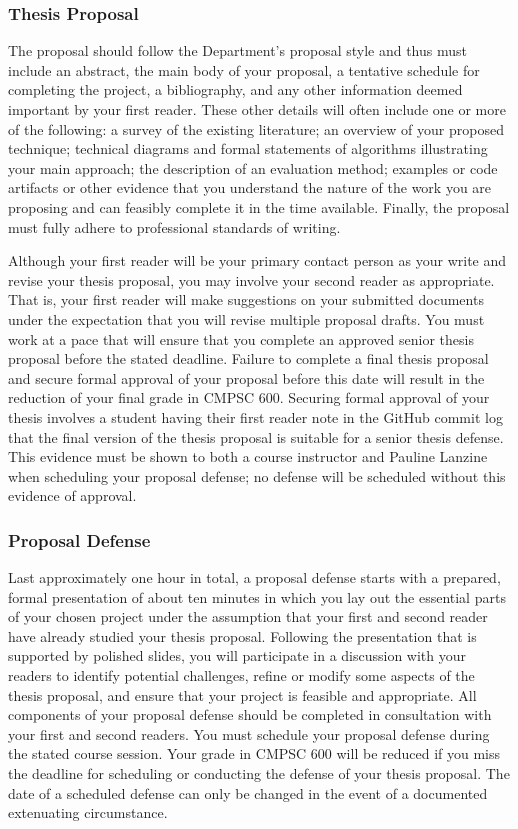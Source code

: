 \documentclass[11pt]{article}
\begin{document}
\subsubsection*{Thesis Proposal}

The proposal should follow the Department's proposal style and thus must include
an abstract, the main body of your proposal, a tentative schedule for completing
the project, a bibliography, and any other information deemed important by your
first reader. These other details will often include one or more of the
following: a survey of the existing literature; an overview of your proposed
technique; technical diagrams and formal statements of algorithms illustrating
your main approach; the description of an evaluation method; examples or code
artifacts or other evidence that you understand the nature of the work you are
proposing and can feasibly complete it in the time available.  Finally, the
proposal must fully adhere to professional standards of writing.

Although your first reader will be your primary contact person as your write and
revise your thesis proposal, you may involve your second reader as appropriate.
That is, your first reader will make suggestions on your submitted documents
under the expectation that you will revise multiple proposal drafts. You must
work at a pace that will ensure that you complete an approved senior thesis
proposal before the stated deadline. Failure to complete a final thesis proposal
and secure formal approval of your proposal before this date will result in the
reduction of your final grade in CMPSC 600. Securing formal approval of your
thesis involves a student having their first reader note in the GitHub commit
log that the final version of the thesis proposal is suitable for a senior
thesis defense. This evidence must be shown to both a course instructor and
Pauline Lanzine when scheduling your proposal defense; no defense will be
scheduled without this evidence of approval.

\subsubsection*{Proposal Defense}

Last approximately one hour in total, a proposal defense starts with a prepared,
formal presentation of about ten minutes in which you lay out the essential
parts of your chosen project under the assumption that your first and second
reader have already studied your thesis proposal. Following the presentation
that is supported by polished slides, you will participate in a discussion with
your readers to identify potential challenges, refine or modify some aspects of
the thesis proposal, and ensure that your project is feasible and appropriate.
All components of your proposal defense should be completed in consultation with
your first and second readers. You must schedule your proposal defense during
the stated course session. Your grade in CMPSC 600 will be reduced if you miss
the deadline for scheduling or conducting the defense of your thesis proposal.
The date of a scheduled defense can only be changed in the event of a documented
extenuating circumstance.
\end{document}
